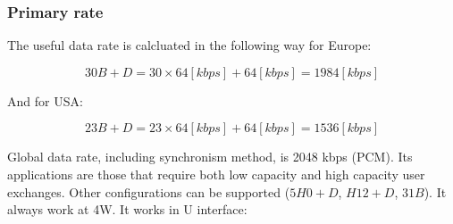 \documentclass[../main.tex]{subfiles}
\begin{document}
\begin{itemize}
{\begin{itemize}
{
			}
		\end{itemize}
	}
\end{itemize}

\subsubsection{Primary rate}

The useful data rate is calcluated in the following way for Europe:

$$
	30B + D = 30 \times 64 [kbps] + 64 [kbps] = 1984 [kbps]
$$

And for USA:

$$
	23B + D = 23 \times 64 [kbps] + 64 [kbps] = 1536 [kbps]
$$

Global data rate, including synchronism method, is 2048 kbps (PCM). Its applications are those that require both low capacity and high capacity user exchanges. Other configurations can be supported ($5H0 + D$, $H12 + D$, $31B$). It always work at 4W. It works in U interface:
\end{document}
